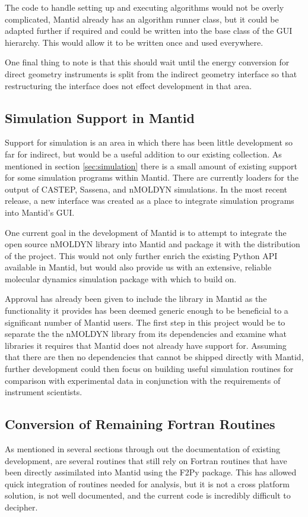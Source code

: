 \documentclass[paper=a4, fontsize=11pt]{scrartcl}	%
\numberwithin{equation}{section}															%
\numberwithin{figure}{section}																%
\numberwithin{table}{section}																%
\begin{document}
The code to handle setting up and executing algorithms would not be overly complicated, Mantid already has an algorithm runner class, but it could be adapted further if required and could be written into the base class of the GUI hierarchy. This would allow it to be written once and used everywhere. 

One final thing to note is that this should wait until the energy conversion for direct geometry instruments is split from the indirect geometry interface so that restructuring the interface does not effect development in that area.

\subsection{Simulation Support in Mantid}
Support for simulation is an area in which there has been little development so far for indirect, but would be a useful addition to our existing collection. As mentioned in section \ref{sec:simulation} there is a small amount of existing support for some simulation programs within Mantid. There are currently loaders for the output of CASTEP, Sassena, and nMOLDYN simulations. In the most recent release, a new interface was created as a place to integrate simulation programs into Mantid's GUI.

One current goal in the development of Mantid is to attempt to integrate the open source nMOLDYN library into Mantid and package it with the distribution of the project. This would not only further enrich the existing Python API available in Mantid, but would also provide us with an extensive, reliable molecular dynamics simulation package with which to build on.

Approval has already been given to include the library in Mantid as the functionality it provides has been deemed generic enough to be beneficial to a significant number of Mantid users. The first step in this project would be to separate the the nMOLDYN library from its dependencies and examine what libraries it requires that Mantid does not already have support for. Assuming that there are then no dependencies that cannot be shipped directly with Mantid, further development could then focus on building useful simulation routines for comparison with experimental data in conjunction with the requirements of instrument scientists.

\subsection{Conversion of Remaining Fortran Routines}
\label{subsec:convert-fortran}
As mentioned in several sections through out the documentation of existing development, are several routines that still rely on Fortran routines that have been directly assimilated into Mantid using the F2Py package. This has allowed quick integration of routines needed for analysis, but it is not a cross platform solution, is not well documented, and the current code is incredibly difficult to decipher.
\end{document}
